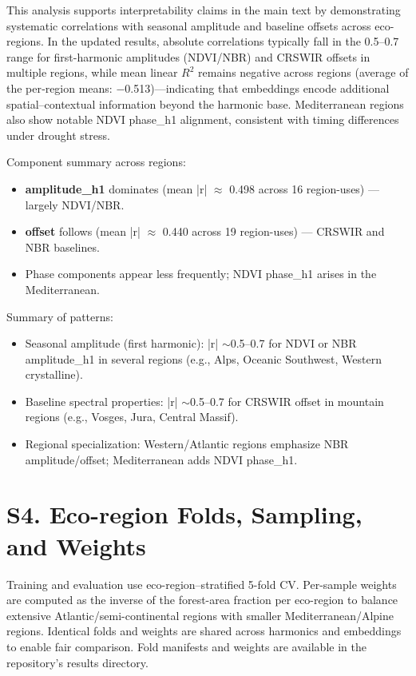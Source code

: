 \documentclass[utf8]{frontiers_suppmat}
\begin{document}
This analysis supports interpretability claims in the main text by demonstrating systematic correlations with seasonal amplitude and baseline offsets across eco-regions. In the updated results, absolute correlations typically fall in the 0.5–0.7 range for first-harmonic amplitudes (NDVI/NBR) and CRSWIR offsets in multiple regions, while mean linear $R^2$ remains negative across regions (average of the per‑region means: −0.513)—indicating that embeddings encode additional spatial–contextual information beyond the harmonic base. Mediterranean regions also show notable NDVI phase\_h1 alignment, consistent with timing differences under drought stress.

Component summary across regions:
\begin{itemize}
    \item \textbf{amplitude\_h1} dominates (mean |r| $\approx$ 0.498 across 16 region-uses) — largely NDVI/NBR.
    \item \textbf{offset} follows (mean |r| $\approx$ 0.440 across 19 region-uses) — CRSWIR and NBR baselines.
    \item Phase components appear less frequently; NDVI phase\_h1 arises in the Mediterranean.
\end{itemize}

Summary of patterns:
\begin{itemize}
    \item Seasonal amplitude (first harmonic): |r| $\sim$0.5–0.7 for NDVI or NBR amplitude\_h1 in several regions (e.g., Alps, Oceanic Southwest, Western crystalline).
    \item Baseline spectral properties: |r| $\sim$0.5–0.7 for CRSWIR offset in mountain regions (e.g., Vosges, Jura, Central Massif).
    \item Regional specialization: Western/Atlantic regions emphasize NBR amplitude/offset; Mediterranean adds NDVI phase\_h1.
\end{itemize}

\section{S4. Eco-region Folds, Sampling, and Weights}

Training and evaluation use eco-region–stratified 5-fold CV. Per-sample weights are computed as the inverse of the forest-area fraction per eco-region to balance extensive Atlantic/semi-continental regions with smaller Mediterranean/Alpine regions. Identical folds and weights are shared across harmonics and embeddings to enable fair comparison. Fold manifests and weights are available in the repository’s results directory.
\end{document}
